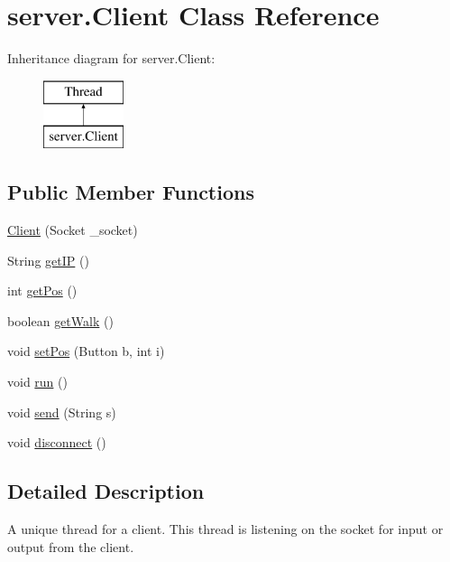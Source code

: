 \hypertarget{classserver_1_1_client}{}\section{server.\+Client Class Reference}
\label{classserver_1_1_client}
Inheritance diagram for server.\+Client\+:\begin{figure}[H]
\begin{center}
\leavevmode
\includegraphics[height=2.000000cm]{classserver_1_1_client}
\end{center}
\end{figure}
\subsection*{Public Member Functions}
\begin{DoxyCompactItemize}
\item 
\hyperlink{classserver_1_1_client_aee63aae8dfec00550d2e2dca453233b8}{Client} (Socket \+\_\+socket)
\item 
String \hyperlink{classserver_1_1_client_a7284190b6acc0b3bba7259386fdc1dae}{get\+IP} ()
\item 
int \hyperlink{classserver_1_1_client_a7007d0065eb9fce43104d0868b480345}{get\+Pos} ()
\item 
boolean \hyperlink{classserver_1_1_client_a372ee497c2b87609e007765b21db53c5}{get\+Walk} ()
\item 
void \hyperlink{classserver_1_1_client_a40f63bbb350bc2f1a65239c04a4a2905}{set\+Pos} (Button b, int i)
\item 
void \hyperlink{classserver_1_1_client_abb9c0d4159442e7618eadebd8c34a2ee}{run} ()
\item 
void \hyperlink{classserver_1_1_client_a87b76abeb1dc06113a33ab759a7f1a2b}{send} (String s)
\item 
void \hyperlink{classserver_1_1_client_a9d49beb9c187a988ba27588038292327}{disconnect} ()
\end{DoxyCompactItemize}


\subsection{Detailed Description}
A unique thread for a client. This thread is listening on the socket for input or output from the client. 

